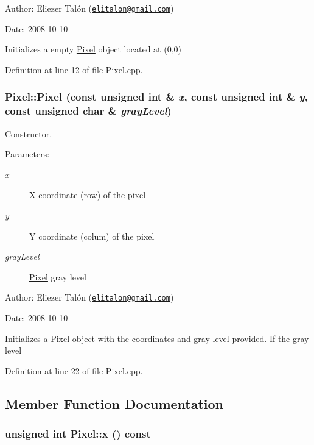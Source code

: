 \begin{Desc}
\item[Author:]Eliezer Talón (\href{mailto:elitalon@gmail.com}{\tt elitalon@gmail.com}) \end{Desc}
\begin{Desc}
\item[Date:]2008-10-10\end{Desc}
Initializes a empty \hyperlink{class_pixel}{Pixel} object located at (0,0) 

Definition at line 12 of file Pixel.cpp.\hypertarget{class_pixel_31103b6b7b52712789d1fdab7ab7ce29}{
\subsubsection[Pixel]{\setlength{\rightskip}{0pt plus 5cm}Pixel::Pixel (const unsigned int \& {\em x}, \/  const unsigned int \& {\em y}, \/  const unsigned char \& {\em grayLevel})}}
\label{class_pixel_31103b6b7b52712789d1fdab7ab7ce29}


Constructor. 

\begin{Desc}
\item[Parameters:]
\begin{description}
\item[{\em x}]X coordinate (row) of the pixel \item[{\em y}]Y coordinate (colum) of the pixel \item[{\em grayLevel}]\hyperlink{class_pixel}{Pixel} gray level\end{description}
\end{Desc}
\begin{Desc}
\item[Author:]Eliezer Talón (\href{mailto:elitalon@gmail.com}{\tt elitalon@gmail.com}) \end{Desc}
\begin{Desc}
\item[Date:]2008-10-10\end{Desc}
Initializes a \hyperlink{class_pixel}{Pixel} object with the coordinates and gray level provided. If the gray level 

Definition at line 22 of file Pixel.cpp.

\subsection{Member Function Documentation}
\hypertarget{class_pixel_68dafccc4588fb33d445641c2766316b}{
\subsubsection[x]{\setlength{\rightskip}{0pt plus 5cm}unsigned int Pixel::x () const}}
\label{class_pixel_68dafccc4588fb33d445641c2766316b}


